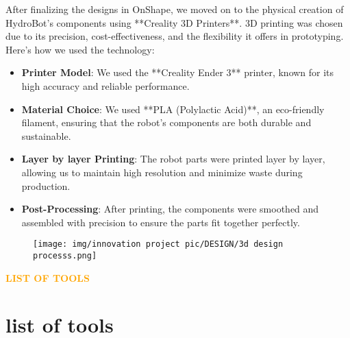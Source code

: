 After finalizing the designs in OnShape, we moved on to the physical creation of HydroBot’s components using **Creality 3D Printers**. 3D printing was chosen due to its precision, cost-effectiveness, and the flexibility it offers in prototyping. Here’s how we used the technology:

\begin{itemize}
    \item \textbf{Printer Model}: We used the **Creality Ender 3** printer, known for its high accuracy and reliable performance.
    \item \textbf{Material Choice}: We used **PLA (Polylactic Acid)**, an eco-friendly filament, ensuring that the robot’s components are both durable and sustainable.
    \item \textbf{Layer by layer Printing}: The robot parts were printed layer by layer, allowing us to maintain high resolution and minimize waste during production.
    \item \textbf{Post-Processing}: After printing, the components were smoothed and assembled with precision to ensure the parts fit together perfectly.
\end{itemize}
\begin{figure}[h!]
    \centering
    \texttt{[image: img/innovation project pic/DESIGN/3d design processs.png]}
\end{figure}


\newpage
\begin{center}
    \huge \textbf{\textcolor{orange}{LIST OF TOOLS}} \\[0.5cm]
\end{center}
\section{\textbf{list of tools}}


